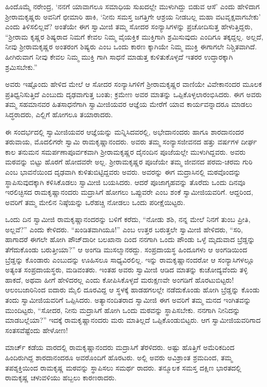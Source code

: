 ಹಿಂದೊಮ್ಮೆ ನರೇಂದ್ರ, ‘ನನಗೆ ಯಾವಾಗಲೂ ಸಮಾಧಿಯ ಸುಖದಲ್ಲೇ ಮುಳುಗಿದ್ದು ಬಿಡುವ ಆಸೆ’ ಎಂದು ಹೇಳಿದಾಗ ಶ್ರೀರಾಮಕೃಷ್ಣರು ಅವನಿಗೆ ಛೀಮಾರಿ ಹಾಕಿ, ‘ನೀನು ಸಮಸ್ತ ಜಗತ್ತಿಗೇ ಆಶ್ರಯ ನೀಡಬಲ್ಲ ಮಹಾ ವಟವೃಕ್ಷವಾಗಬೇಕು’ ಎಂದು ತಿಳಿಸಲಿಲ್ಲವೆ? ಅಂತೆಯೇ ಈಗ ಸ್ವಾಮೀಜಿ ತಮ್ಮ ಸೋದರ ಸಂನ್ಯಾಸಿಗಳನ್ನು ಪ್ರಚೋದಿಸುತ್ತ ಹೇಳುತ್ತಿದ್ದರು, “ಶ್ರೀರಾಮ ಕೃಷ್ಣರ ಶಿಷ್ಯರಾದ ನಿಮಗೆ ಕೇವಲ ನಿಮ್ಮ ವೈಯಕ್ತಿಕ ಮುಕ್ತಿಗಾಗಿ ಶ್ರಮಿಸುವುದು ಎಂದಿಗೂ ತಕ್ಕದ್ದಲ್ಲ. ಅಲ್ಲದೆ, ನೀವು ಶ್ರೀರಾಮಕೃಷ್ಣರ ಅಂತರಂಗ ಶಿಷ್ಯರು ಎಂಬ ಒಂದು ಕಾರಣ ಕ್ಕಾಗಿಯೇ ನಿಮ್ಮ ಮುಕ್ತಿ ಈಗಾಗಲೇ ನಿಶ್ಚಿತವಾಗಿದೆ. ಹೀಗಿರುವಾಗ ನೀವು ಕೇವಲ ನಿಮ್ಮ ಮುಕ್ತಿ ಗಾಗಿ ಸಾಧನೆ ಮಾಡುತ್ತ ಕುಳಿತುಕೊಳ್ಳದೆ ಇತರರ ಉದ್ಧಾರಕ್ಕಾಗಿ ಶ್ರಮಿಸಬೇಕು.”

ಅವರು ಇಷ್ಟೊಂದು ಹೇಳಿದ ಮೇಲೆ ಆ ಸೋದರ ಸಂನ್ಯಾಸಿಗಳಿಗೆ ಶ್ರೀರಾಮಕೃಷ್ಣರ ವಾಣಿಯೇ ವಿವೇಕಾನಂದರ ಮೂಲಕ ಪ್ರತಿಧ್ವನಿಸುತ್ತಿದೆ ಎಂಬುದು ದೃಢವಾಗುತ್ತ ಬಂತು; ಕ್ರಮೇಣ ಅವರ ಮಾತನ್ನು ಒಪ್ಪಿಕೊಳ್ಳಲಾರಂಭಿಸಿದರು. ಈಗ ಅವರು ತಮ್ಮ ಸಹಮಾನವರ ಹಿತಸಾಧನೆಗಾಗಿ ಸ್ವಾಮೀಜಿಯವರ ಆಜ್ಞೆಯ ಮೇರೆಗೆ ಯಾವ ಕಾರ್ಯವನ್ನಾದರೂ ಮಾಡಲು ಸಿದ್ಧರಾದರು, ಎಲ್ಲಿಗೆ ಹೋಗಲೂ ತಯಾರಾದರು.

ಈ ಸಂದರ್ಭದಲ್ಲಿ ಸ್ವಾಮೀಜಿಯವರ ಆಜ್ಞೆಯನ್ನು ಮನ್ನಿಸಿದವರಲ್ಲಿ, ಅಭೇದಾನಂದರು ಹಾಗೂ ಶಾರದಾನಂದರ ತರುವಾಯ, ಮೊದಲಿಗರೇ ಸ್ವಾಮಿ ರಾಮಕೃಷ್ಣಾನಂದರು. ಅವರು ತಮ್ಮ ಸಂನ್ಯಾಸಜೀವನದ ಹತ್ತು ವರ್ಷಗಳ ದೀರ್ಘ ಕಾಲ ತನುಮನ ಸಮರ್ಪಣಾಪೂರ್ವಕವಾಗಿ ಶ್ರೀರಾಮಕೃಷ್ಣರ ದೈನಂದಿನ ಪೂಜೆಯಲ್ಲೇ ಮುಳುಗಿದ್ದವರು. ಅವರು ಮಠವನ್ನು ಬಿಟ್ಟು ಹೊರಗೆ ಹೋದವರೇ ಅಲ್ಲ. ಶ್ರೀರಾಮಕೃಷ್ಣರ ಪೂಜೆಯೇ ತಮ್ಮ ಜೀವನದ ಪರಮ-ಚರಮ ಗುರಿ ಎಂಬ ಭಾವನೆಯಿಂದ ದೃಢವಾಗಿ ಕುಳಿತುಬಿಟ್ಟಿದ್ದವರು ಅವರು. ಅವರನ್ನು ಈಗ ಮದ್ರಾಸಿನಲ್ಲಿ ಮಠವೊಂದನ್ನು ಸ್ಥಾಪಿಸುವುದಕ್ಕಾಗಿ ಕಳಿಸಿಕೊಡಲು ಸ್ವಾಮೀಜಿ ಬಯಸಿದರು. ಆದರೆ ಪೂಜಾಗೃಹವನ್ನು ತೊರೆದು ಒಂದು ದಿನವೂ ಇರಲಿಚ್ಛಿಸದ ರಾಮಕೃಷ್ಣಾನಂದರು ಮದ್ರಾಸಿಗೆ ಹೋಗಲು ಒಪ್ಪುವರೇ ಎಂಬ ಶಂಕೆ ಸ್ವಾಮೀಜಿಯವರಿಗೆ. ಆದ್ದರಿಂದ, ಅವರಿಗೆ ತಮ್ಮ ಮೇಲಿನ ನಿಷ್ಠೆಯನ್ನು ಒರೆಹಚ್ಚಿ ನೋಡಲು ಒಂದು ಪರೀಕ್ಷೆಯಿಟ್ಟರು.

ಒಂದು ದಿನ ಸ್ವಾಮೀಜಿ ರಾಮಕೃಷ್ಣಾನಂದರನ್ನು ಬಳಿಗೆ ಕರೆದು, “ನೋಡು ಶಶಿ, ನನ್ನ ಮೇಲೆ ನಿನಗೆ ತುಂಬ ಪ್ರೀತಿ, ಅಲ್ಲವೆ?” ಎಂದು ಕೇಳಿದರು. “ಖಂಡಿತವಾಗಿಯೂ!” ಎಂಬ ಉತ್ತರ ಬರುತ್ತಲೇ ಸ್ವಾಮೀಜಿ ಹೇಳಿದರು, “ಸರಿ, ಹಾಗಾದರೆ ಈಗಲೇ ಹೋಗಿ ಪೌಜ್​ದಾರೀ ಬಲಖಾನಾ ದಿಂದ ನನಗಾಗಿ ಒಂದು ಪೌಂಡು ಒಳ್ಳೆ ಮೃದುವಾದ ಬ್ರೆಡ್ಡನ್ನು ತೆಗೆದುಕೊಂಡು ಬರುತ್ತೀಯಾ?” ಆ ಅಂಗಡಿ ಮುಸಲ್ಮಾನರದ್ದು. ಸಂಪ್ರದಾಯಸ್ಥ ಹಿಂದೂಗಳು ಆ ಅಂಗಡಿಯಿಂದ ಬ್ರೆಡ್ಡನ್ನು ಕೊಂಡಾರು ಎಂಬುದನ್ನು ಊಹಿಸಲೂ ಸಾಧ್ಯವಿರಲಿಲ್ಲ. ಇನ್ನು ರಾಮಕೃಷ್ಣಾನಂದರೋ ಆ ಸಂನ್ಯಾಸಿಗಳಲ್ಲೂ ಅತ್ಯಂತ ಸಂಪ್ರದಾಯಸ್ಥರು, ಮಡಿವಂತರು. ಇಂತಹ ಅವರು ಸ್ವಾಮೀಜಿ ಆಡಿದ ಮಾತನ್ನು ಕುಚೋದ್ಯವೆಂದು ತಳ್ಳಿ ಹಾಕದೆ, ಅಥವಾ ಹೀಗೆ ಹೇಳಿದರಲ್ಲ ಎಂದು ಕೋಪಿಸಿಕೊಳ್ಳದೆ ಮರುಕ್ಷಣವೇ ಅಂಗಡಿಗೆ ಹೊರಟುಬಿಟ್ಟರು! ಆಲಂಬಜಾರಿನಿಂದ ಐದಾರು ಮೈಲಿ ದೂರವಿದ್ದ ಆ ಸ್ಥಳಕ್ಕೆ ಹಾಡಹಗಲಲ್ಲೇ ನಡೆದುಕೊಂಡು ಹೋಗಿ ಬ್ರೆಡ್ಡನ್ನು ಕೊಂಡು ತಂದು ಸ್ವಾಮೀಜಿಯವರಿಗೆ ಒಪ್ಪಿಸಿದರು. ಅತ್ಯಾನಂದಿತರಾದ ಸ್ವಾಮೀಜಿ ಈಗ ಅವರಿಗೆ ತಮ್ಮ ಮನದ ಇಂಗಿತವನ್ನು ಮುಂದಿಟ್ಟರು, “ಸೋದರ, ನೀನು ಮದ್ರಾಸಿಗೆ ಹೋಗಿ ಒಂದು ಮಠವನ್ನು ಸ್ಥಾಪಿಸಬೇಕು. ನನಗಾಗಿ ನೀನಿದನ್ನು ಮಾಡಬಲ್ಲೆಯಾ?” ಇದಕ್ಕೆ ರಾಮಕೃಷ್ಣಾನಂದರು ಮರು ಮಾತಿಲ್ಲದೆ ಒಪ್ಪಿಕೊಂಡುಬಿಟ್ಟರು. ಆಗ ಸ್ವಾಮೀಜಿಯವರಿಗಾದ ಸಂತಸವೆಷ್ಟೆಂದು ಹೇಳೋಣ!

ಮಾರ್ಚ್ ಕಡೆಯ ವಾರದಲ್ಲಿ ರಾಮಕೃಷ್ಣಾನಂದರು ಮದ್ರಾಸಿಗೆ ತೆರಳಿದರು. ಅಷ್ಟು ಹೊತ್ತಿಗೆ ಅಮೆರಿಕದಿಂದ ಹಿಂದಿರುಗಿದ್ದ ಶಾರದಾನಂದರೂ ಅವರೊಂದಿಗೆ ಹೊರಟರು. ಅಲ್ಲಿ ಅವರು ಅವಿಶ್ರಾಂತ ಶ್ರಮದಿಂದ, ತಮ್ಮ ತಪಶ್ಶಕ್ತಿಯಿಂದ ರಾಮಕೃಷ್ಣ ಮಠವನ್ನು ಸ್ಥಾಪಿಸಲು ಸಮರ್ಥ ರಾದರು. ತನ್ಮೂಲಕ ಸಮಸ್ತ ದಕ್ಷಿಣ ಭಾರತದಲ್ಲಿ ರಾಮಕೃಷ್ಣ ಚಳುವಳಿಯು ಹಬ್ಬಲು ಕಾರಣರಾದರು.

